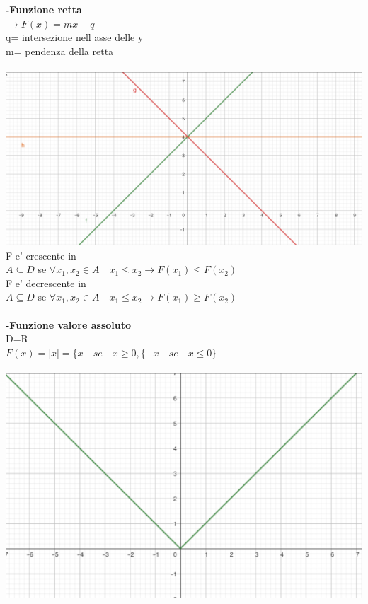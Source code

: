 \documentclass{article}
\begin{document}
\textbf{-Funzione retta}\\
$\to F(x)=mx + q$\\
q= intersezione nell asse delle y\\
m= pendenza della retta\\
\\
\includegraphics{./immagini/funzione-retta.png}
\\
F e' crescente in\\
$A \subseteq D$ se $\forall x_{1},x_{2} \in A \quad x_{1} \leq x_{2} \to F(x_{1}) \leq F(x_{2})$
\\
F e' decrescente in\\
$A \subseteq D$ se $\forall x_{1},x_{2} \in A \quad x_{1} \leq x_{2} \to F(x_{1}) \geq F(x_{2})$\\
\\
\textbf{-Funzione valore assoluto}\\
D=R\\
$F(x)=|x|=\{ x \quad se \quad x \geq 0,\{ -x \quad se \quad x \leq 0\}$\\
\\
\includegraphics{./immagini/funzione-modulo.png}
\end{document}

